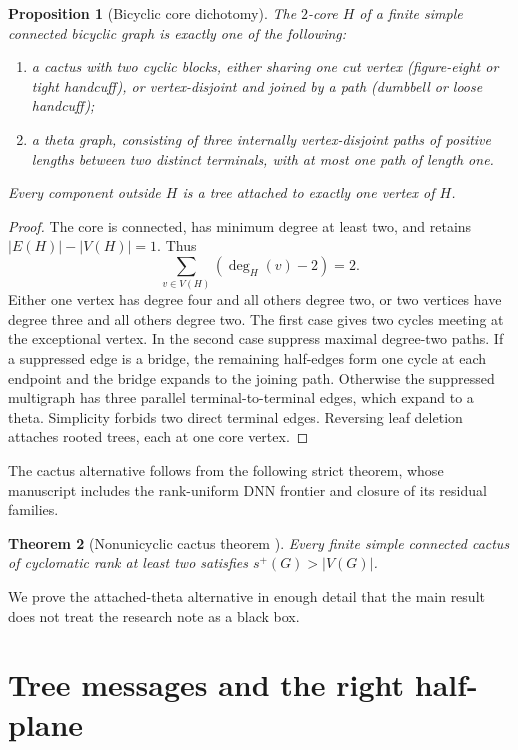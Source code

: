 \documentclass[11pt]{article}
\newtheorem{theorem}{Theorem}[section]
\newtheorem{proposition}[theorem]{Proposition}
\theoremstyle{remark}
\newcommand{\splus}{s^+}
\begin{document}
\begin{proposition}[Bicyclic core dichotomy]\label{prop:structure}
The $2$-core $H$ of a finite simple connected bicyclic graph is exactly one of
the following:
\begin{enumerate}
 \item a cactus with two cyclic blocks, either sharing one cut vertex
 (figure-eight or tight handcuff), or vertex-disjoint and joined by a path
 (dumbbell or loose handcuff);
 \item a theta graph, consisting of three internally vertex-disjoint paths of
 positive lengths between two distinct terminals, with at most one path of
 length one.
\end{enumerate}
Every component outside $H$ is a tree attached to exactly one vertex of $H$.
\end{proposition}

\begin{proof}
The core is connected, has minimum degree at least two, and retains
$|E(H)|-|V(H)|=1$.  Thus
\[
 \sum_{v\in V(H)}(\deg_H(v)-2)=2.
\]
Either one vertex has degree four and all others degree two, or two vertices
have degree three and all others degree two.  The first case gives two cycles
meeting at the exceptional vertex.  In the second case suppress maximal
degree-two paths.  If a suppressed edge is a bridge, the remaining half-edges
form one cycle at each endpoint and the bridge expands to the joining path.
Otherwise the suppressed multigraph has three parallel terminal-to-terminal
edges, which expand to a theta.  Simplicity forbids two direct terminal edges.
Reversing leaf deletion attaches rooted trees, each at one core vertex.
\end{proof}

The cactus alternative follows from the following strict theorem, whose
manuscript includes the rank-uniform DNN frontier and closure of its residual
families.

\begin{theorem}[Nonunicyclic cactus theorem \cite{Cactus}]\label{thm:cactus}
Every finite simple connected cactus of cyclomatic rank at least two satisfies
$\splus(G)>|V(G)|$.
\end{theorem}

We prove the attached-theta alternative in enough detail that the main result
does not treat the research note as a black box.

\section{Tree messages and the right half-plane}
\end{document}

